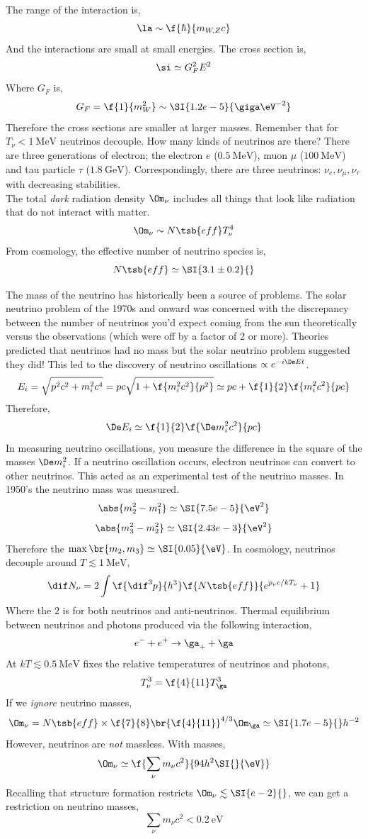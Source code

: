 \documentclass{article}
\begin{document}
The range of the interaction is,
\[ \la \sim \f{\hbar }{m_{W, Z} c} \]
And the interactions are small at small energies. The cross section is,
\[ \si \simeq G_F^2 E^2 \]
Where $G_F$ is,
\[ G_F = \f{1}{m_{W}^2} \sim \SI{1.2e-5}{\giga \eV^{-2}} \]
Therefore the cross sections are smaller at larger masses. Remember that for $T_{\nu} < \SI{1}{\mega \eV}$ neutrinos decouple. How many kinds of neutrinos are there? There are three generations of electron; the electron $e$ ($\SI{0.5}{\mega\eV}$), muon $\mu$ ($\SI{100}{\mega\eV}$) and tau particle $\tau$ ($\SI{1.8}{\giga\eV}$). Correspondingly, there are three neutrinos: $\nu_{e}, \nu_{\mu}, \nu_{\tau}$ with decreasing stabilities. \\

The total \textit{dark} radiation density $\Om_{\nu}$ includes all things that look like radiation that do not interact with matter.
\[ \Om_{\nu} \sim N\tsb{eff} T_{\nu}^4 \]
From cosmology, the effective number of neutrino species is,
\[ N\tsb{eff} \simeq \SI{3.1\pm0.2}{} \]

The mass of the neutrino has historically been a source of problems. The solar neutrino problem of the 1970s and onward was concerned with the discrepancy between the number of neutrinos you'd expect coming from the sun theoretically versus the observations (which were off by a factor of $2$ or more). Theories predicted that neutrinos had no mass but the solar neutrino problem suggested they did! This led to the discovery of neutrino oscillations $\propto e^{-i \De Et}$.
\[ E_i = \sqrt{p^2 c^2 + m_i^2 c^4} = pc \sqrt{1 + \f{m_i^2 c^2}{p^2}} \simeq pc + \f{1}{2} \f{m_i^2c^2}{pc} \]
Therefore,
\[ \De E_i \simeq \f{1}{2}\f{\De m_i^2c^2}{pc} \]
In measuring neutrino oscillations, you measure the difference in the square of the masses $\De m_i^2$. If a neutrino oscillation occurs, electron neutrinos can convert to other neutrinos. This acted as an experimental test of the neutrino masses. In 1950's the neutrino mass was measured.
\[ \abs{m_2^2 - m_1^2} \simeq \SI{7.5e-5}{\eV^2} \]
\[ \abs{m_3^2 - m_2^2} \simeq \SI{2.43e-3}{\eV^2} \]
Therefore the $\max \br{m_2, m_3} \simeq \SI{0.05}{\eV}$. In cosmology, neutrinos decouple around $T \lesssim \SI{1}{\mega \eV}$,
\[ \dif N_\nu = 2 \int \f{\dif^3 p}{h^3} \f{N\tsb{eff}}{e^{p_{\nu}c / kT_{\nu}} + 1} \]
Where the $2$ is for both neutrinos and anti-neutrinos. Thermal equilibrium between neutrinos and photons produced via the following interaction,
\[ e^{-} + e^{+} \to \ga_{+} + \ga  \]
At $kT \lesssim \SI{0.5}{\mega \eV}$ fixes the relative temperatures of neutrinos and photons,
\[ T_{\nu}^3 = \f{4}{11} T_{\ga}^3 \]
If we \textit{ignore} neutrino masses,
\[ \Om_{\nu} = N\tsb{eff} \times \f{7}{8} \br{\f{4}{11}}^{4/3} \Om_{\ga} \simeq \SI{1.7e-5}{}h^{-2}    \]
However, neutrinos are \textit{not} massless. With masses,
\[ \Om_{\nu} \simeq \f{\sum_{\nu} m_{\nu} c^2}{94 h^2 \SI{}{\eV}}\]
Recalling that structure formation restricts $\Om_\nu \lesssim \SI{e-2}{}$, we can get a restriction on neutrino masses,
\[ \sum_{\nu} m_{\nu}c^2 < \SI{0.2}{\eV} \]
\end{document}
